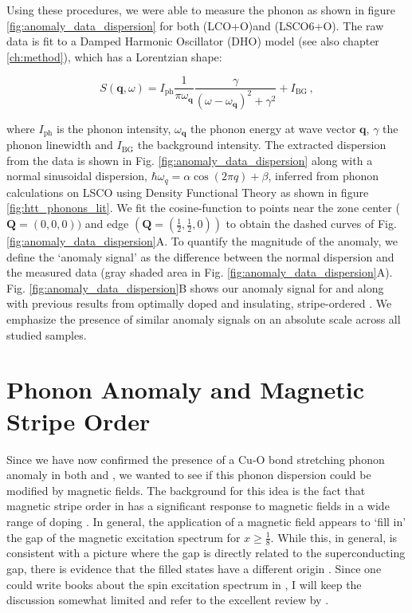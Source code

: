 Using these procedures, we were able to measure the phonon as shown in figure \ref{fig:anomaly_data_dispersion} for both \LCOO{} (LCO+O)and \LSCOOsix{} (LSCO6+O). The raw data is fit to a Damped Harmonic Oscillator (DHO) model \cite{Fak1997} (see also chapter \ref{ch:method}), which has a Lorentzian shape:

\begin{equation}
    S(\bm{q},\omega) = I_\text{ph} \frac{1}{\pi \omega_{\bm{q}}} \frac{\gamma}{(\omega - \omega_{\bm{q}})^2 + \gamma^2} + I_\text{BG} \, ,
\end{equation}

\noindent where $I_\text{ph}$ is the phonon intensity, $\omega_{\bm{q}}$ the phonon energy at wave vector $\bm{q}$, $\gamma$ the phonon linewidth and $I_\text{BG}$ the background intensity. The extracted dispersion from the data is shown in Fig. \ref{fig:anomaly_data_dispersion} along with a normal sinusoidal dispersion, $\hbar\omega_q=\alpha \cos(2 \pi q) + \beta$, inferred from phonon calculations on LSCO using Density Functional Theory as shown in figure \ref{fig:htt_phonons_lit}. We fit the cosine-function to points near the zone center ($\bm{Q}=(0,0,0))$ and edge $(\bm{Q}=(\frac{1}{2},\frac{1}{2},0))$ to obtain the dashed curves of Fig. \ref{fig:anomaly_data_dispersion}A. To quantify the magnitude of the anomaly, we define the `anomaly signal' as the difference between the normal dispersion and the measured data (gray shaded area in Fig. \ref{fig:anomaly_data_dispersion}A). Fig. \ref{fig:anomaly_data_dispersion}B shows our anomaly signal for \LCOO{} and \LSCOOsix{} along with previous results from optimally doped \LSCOopt{} and insulating, stripe-ordered \LNSCO{} \cite{Reznik2007}. We emphasize the presence of similar anomaly signals on an absolute scale across all studied samples.

\section{Phonon Anomaly and Magnetic Stripe Order}
Since we have now confirmed the presence of a Cu-O bond stretching phonon anomaly in both \LCOO{} and \LSCOOsix{}, we wanted to see if this phonon dispersion could be modified by magnetic fields. The background for this idea is the fact that magnetic stripe order in \LSCO{} has a significant response to magnetic fields in a wide range of doping \cite{Chang2008,Kofu2009,Romer2013,Tranquada2004,Lake2001}. In general, the application of a magnetic field appears to `fill in' the gap of the magnetic excitation spectrum for $x \geq \frac{1}{8}$. While this, in general, is consistent with a picture where the gap is directly related to the superconducting gap, there is evidence that the filled states have a different origin \cite{Kofu2009}. Since one could write books about the spin excitation spectrum in \LSCO{}, I will keep the discussion somewhat limited and refer to the excellent review by \citeauthor{Tranquada2013} \cite{Tranquada2013}.


